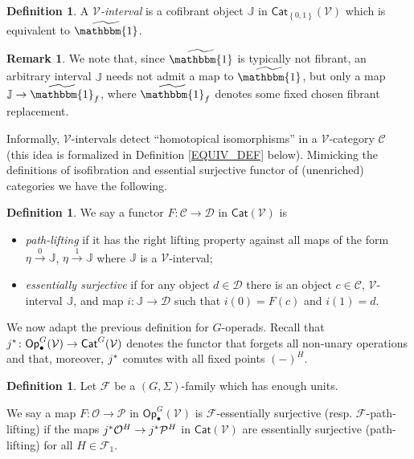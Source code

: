 \documentclass[a4paper,10pt
,draft
]{article}%
\numberwithin{equation}{section}
\numberwithin{figure}{section}
\theoremstyle{definition} %
\newtheorem{definition}[equation]{Definition}%
\newtheorem{remark}[equation]{Remark}%
\newcommand{\set}[1]{\left\{#1\right\}}%
\newcommand{\Cat}{\mathsf{Cat}}
\newcommand{\F}{\ensuremath{\mathcal F}}
\newcommand{\V}{\ensuremath{\mathcal V}}
\renewcommand{\O}{\ensuremath{\mathcal O}}
\renewcommand{\P}{\ensuremath{\mathcal P}}
\newcommand{\1}{\ensuremath{\mathbbm 1}}%
\begin{document}
\begin{definition}
	A {\em $\V$-interval} is a cofibrant object $\mathbb{J}$ in $\Cat_{\set{0,1}}(\V)$
	which is equivalent to $\widetilde{\mathbbm{1}}$.
\end{definition}



\begin{remark}
	We note that, since $\widetilde{\mathbbm{1}}$ is typically not fibrant,
	an arbitrary interval $\mathbb{J}$
	needs not admit a map to $\widetilde{\mathbbm{1}}$,
	but only a map $\mathbb{J} \to \widetilde{\mathbbm{1}}_f$,
	where $\widetilde{\mathbbm{1}}_f$ denotes some fixed chosen fibrant replacement.
\end{remark}



Informally, $\V$-intervals detect ``homotopical isomorphisms'' in a $\V$-category $\mathcal{C}$ 
(this idea is formalized in Definition \ref{EQUIV_DEF} below).
Mimicking the definitions of isofibration and essential surjective functor of (unenriched) categories we have the following.


\begin{definition}\label{PL_ES_DEFN}
We say a functor $F: \mathcal C \to \mathcal D$ in $\Cat(\V)$ is
\begin{itemize}
\item \textit{path-lifting}
	if it has the right lifting property against all maps of the form
	$\eta \xrightarrow{0} \mathbb{J}$, $\eta \xrightarrow{1} \mathbb{J}$
	where $\mathbb{J}$ is a $\V$-interval;
\item \textit{essentially surjective} 
	if for any object $d \in \mathcal{D}$
	there is an object $c \in \mathcal{C}$,
	$\V$-interval $\mathbb{J}$,
	and map $i \colon \mathbb{J} \to \mathcal D$
	such that $i(0) = F(c)$ and $i(1)=d$.
      \end{itemize}
\end{definition}



We now adapt the previous definition for $G$-operads.
Recall that $j^{\**} \colon \mathsf{Op}^G_\bullet(\V) \to \mathsf{Cat}^G(\V)$
denotes the functor that forgets all non-unary operations and that, moreover, 
$j^{\**}$ comutes with all fixed points $(-)^H$.


\begin{definition}\label{FESSENSURJ DEF}
Let $\F$ be a $(G, \Sigma)$-family which has enough units.

We say a map $F: \O \to \P$ in $\mathsf{Op}^G_\bullet(\V)$
is $\F$-essentially surjective (resp. $\F$-path-lifting)
if the maps
$j^{\**}\O^H \to j^{\**} \P^H$
in $\mathsf{Cat}(\V)$ are essentially surjective (path-lifting) for all $H \in \F_1$.
\end{definition}
\end{document}
